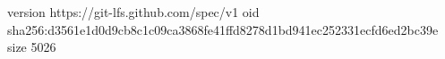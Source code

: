 version https://git-lfs.github.com/spec/v1
oid sha256:d3561e1d0d9cb8c1c09ca3868fe41ffd8278d1bd941ec252331ecfd6ed2bc39e
size 5026
